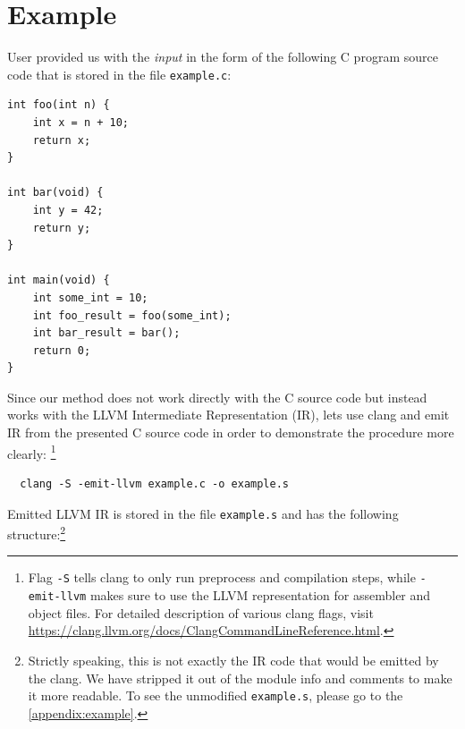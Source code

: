 \documentclass[12pt, twoside]{fithesis2}
\renewcommand{\_}{\leavevmode \kern0.07em\vbox{\hrule width0.4em}}
\begin{document}
\section{Example}
\label{sec:method_example}

User provided us with the \emph{input} in the form of the following
C program source code that is stored in the file \texttt{example.c}:

\begin{verbatim}
int foo(int n) {
    int x = n + 10;
    return x;
}

int bar(void) {
    int y = 42;
    return y;
}

int main(void) {
    int some_int = 10;
    int foo_result = foo(some_int);
    int bar_result = bar();
    return 0;
}
\end{verbatim}

Since our method does not work directly with the C source code but instead
works with the LLVM Intermediate Representation (IR), lets use clang and emit
IR from the presented C source code in order to demonstrate the procedure more
clearly:
\footnote {
Flag \texttt{-S} tells clang to only run preprocess and
compilation steps, while \texttt{-emit-llvm} makes sure to use the LLVM
representation for assembler and object files. For detailed description of
various clang flags, visit
\url{https://clang.llvm.org/docs/ClangCommandLineReference.html}.
}

\begin{verbatim}
  clang -S -emit-llvm example.c -o example.s
\end{verbatim}

Emitted LLVM IR is stored in the file \texttt{example.s} and
has the following structure:\footnote{
Strictly speaking, this is not exactly the IR code that would be emitted by the
clang. We have stripped it out of the module info and comments to make it more
readable. To see the unmodified \texttt{example.s}, please go to the
\autoref{appendix:example}.
}
\end{document}
